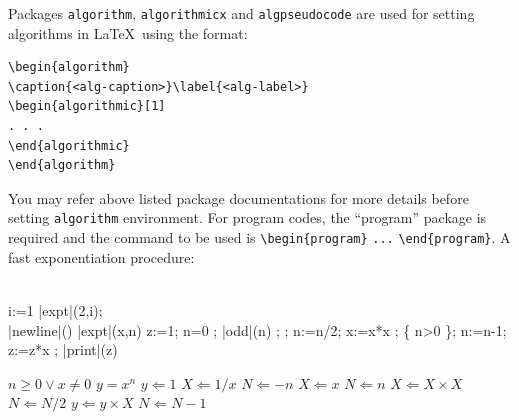 \documentclass[sn-mathphys]{sn-jnl}%
\theoremstyle{thmstyleone}%
\theoremstyle{thmstyletwo}%
\theoremstyle{thmstylethree}%
\begin{document}
Packages \verb+algorithm+, \verb+algorithmicx+ and \verb+algpseudocode+ are used for setting algorithms in \LaTeX\ using the format:

\bigskip
\begin{verbatim}
\begin{algorithm}
\caption{<alg-caption>}\label{<alg-label>}
\begin{algorithmic}[1]
. . .
\end{algorithmic}
\end{algorithm}
\end{verbatim}
\bigskip

You may refer above listed package documentations for more details before setting \verb+algorithm+ environment. For program codes, the ``program'' package is required and the command to be used is \verb+\begin{program}+ \verb+...+ \verb+\end{program}+. A fast exponentiation procedure:

\begin{program}
\BEGIN \\ %
  \FOR i:=1   \DO
     |expt|(2,i); \\ |newline|() \OD %
\WHERE
\PROC |expt|(x,n) \BODY
          z:=1;
          \DO \IF n=0 \THEN \EXIT \FI;
             \DO \IF |odd|(n) \THEN \EXIT \FI;
;
                n:=n/2; x:=x*x \OD;
             \{ n>0 \};
             n:=n-1; z:=z*x \OD;
          |print|(z) \ENDPROC
\END
\end{program}


\begin{algorithm}
\caption{Calculate $y = x^n$}\label{algo1}
\begin{algorithmic}[1]
\Require $n \geq 0 \vee x \neq 0$
\Ensure $y = x^n$ 
\State $y \Leftarrow 1$
\label{algln2}
        \State $X \Leftarrow 1 / x$
        \State $N \Leftarrow -n$
\Else
        \State $X \Leftarrow x$
        \State $N \Leftarrow n$
\EndIf
{}
            \State $X \Leftarrow X \times X$
            \State $N \Leftarrow N / 2$
        \Else[$N$ is odd]
            \State $y \Leftarrow y \times X$
            \State $N \Leftarrow N - 1$
        \EndIf
\EndWhile
\end{algorithmic}
\end{algorithm}
\bigskip
\end{document}
